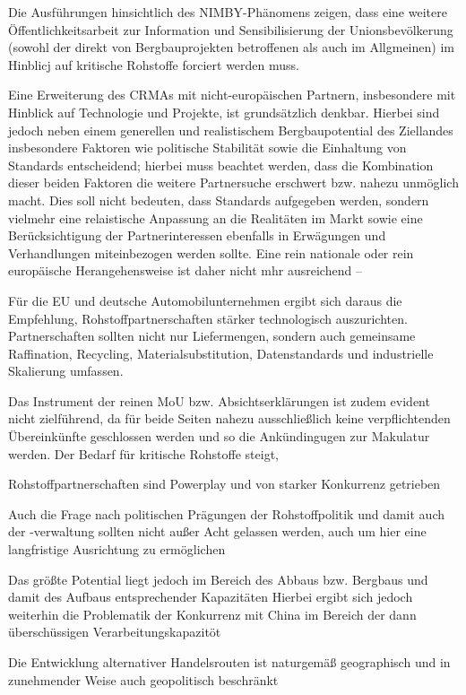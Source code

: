 \documentclass[12pt,a4paper,oneside]{book} %
\begin{document}
Die Ausführungen hinsichtlich des NIMBY-Phänomens zeigen, dass eine weitere Öffentlichkeitsarbeit zur Information und Sensibilisierung der Unionsbevölkerung (sowohl der direkt von Bergbauprojekten betroffenen als auch im Allgmeinen) im Hinblicj auf kritische Rohstoffe forciert werden muss.


Eine Erweiterung des CRMAs mit nicht-europäischen Partnern, insbesondere mit Hinblick auf Technologie und Projekte, ist grundsätzlich denkbar. Hierbei sind jedoch neben einem generellen und realistischem Bergbaupotential des Ziellandes insbesondere Faktoren wie politische Stabilität sowie die Einhaltung von Standards entscheidend; hierbei muss beachtet werden, dass die Kombination dieser beiden Faktoren die weitere Partnersuche erschwert bzw. nahezu unmöglich macht. Dies soll nicht bedeuten, dass Standards aufgegeben werden, sondern vielmehr eine relaistische Anpassung an die Realitäten im Markt sowie eine Berücksichtigung der Partnerinteressen ebenfalls in Erwägungen und Verhandlungen miteinbezogen werden sollte. Eine rein nationale oder rein europäische Herangehensweise ist daher nicht mhr ausreichend -- 

Für die EU und deutsche Automobilunternehmen ergibt sich daraus die Empfehlung, Rohstoffpartnerschaften stärker technologisch auszurichten. Partnerschaften sollten nicht nur Liefermengen, sondern auch gemeinsame Raffination, Recycling, Materialsubstitution, Datenstandards und industrielle Skalierung umfassen.

Das Instrument der reinen MoU bzw. Absichtserklärungen ist zudem evident nicht zielführend, da für beide Seiten nahezu ausschließlich keine verpflichtenden Übereinkünfte geschlossen werden und so die Ankündingugen zur Makulatur werden. Der Bedarf für kritische Rohstoffe steigt, 

Rohstoffpartnerschaften sind Powerplay und von starker Konkurrenz getrieben

Auch die Frage nach politischen Prägungen der Rohstoffpolitik und damit auch der -verwaltung sollten nicht außer Acht gelassen werden, auch um hier eine langfristige Ausrichtung zu ermöglichen

Das größte Potential liegt jedoch im Bereich des Abbaus bzw. Bergbaus und damit des Aufbaus entsprechender Kapazitäten
Hierbei ergibt sich jedoch weiterhin die Problematik der Konkurrenz mit China im Bereich der dann überschüssigen Verarbeitungskapazitöt

Die Entwicklung alternativer Handelsrouten ist naturgemäß geographisch und in zunehmender Weise auch geopolitisch beschränkt
\end{document}
